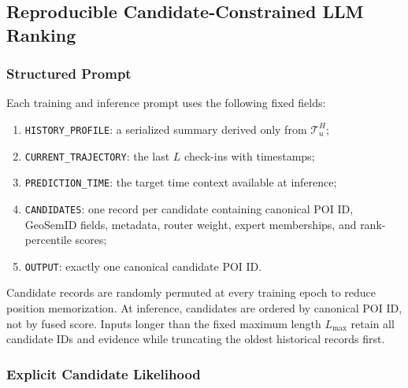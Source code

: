 \documentclass[journal]{IEEEtran}
\begin{document}
\subsection{Reproducible Candidate-Constrained LLM Ranking}
\label{subsec:ranker}

\subsubsection{Structured Prompt}

Each training and inference prompt uses the following fixed fields:
\begin{enumerate}[leftmargin=*,nosep]
\item \texttt{HISTORY\_PROFILE}: a serialized summary derived only from
$\mathcal{T}_{u}^{H}$;
\item \texttt{CURRENT\_TRAJECTORY}: the last $L$ check-ins with timestamps;
\item \texttt{PREDICTION\_TIME}: the target time context available at inference;
\item \texttt{CANDIDATES}: one record per candidate containing canonical POI
ID, GeoSemID fields, metadata, router weight, expert memberships, and
rank-percentile scores;
\item \texttt{OUTPUT}: exactly one canonical candidate POI ID.
\end{enumerate}
Candidate records are randomly permuted at every training epoch to reduce
position memorization.
At inference, candidates are ordered by canonical POI ID, not by fused score.
Inputs longer than the fixed maximum length $L_{\max}$ retain all candidate
IDs and evidence while truncating the oldest historical records first.

\subsubsection{Explicit Candidate Likelihood}
\end{document}
